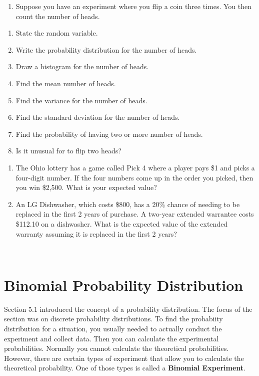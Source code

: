 \documentclass[]{book}
\providecommand{\tightlist}{%
  \setlength{\itemsep}{0pt}\setlength{\parskip}{0pt}}
\begin{document}
\begin{enumerate}
\def\labelenumi{\arabic{enumi}.}
\setcounter{enumi}{1}
\tightlist
\item
  Suppose you have an experiment where you flip a coin three times. You then count the number of heads.
\end{enumerate}

\begin{enumerate}
\def\labelenumi{\alph{enumi}.}
\tightlist
\item
  State the random variable.
\item
  Write the probability distribution for the number of heads.
\item
  Draw a histogram for the number of heads.
\item
  Find the mean number of heads.
\item
  Find the variance for the number of heads.
\item
  Find the standard deviation for the number of heads.
\item
  Find the probability of having two or more number of heads.
\item
  Is it unusual for to flip two heads?
\end{enumerate}

\begin{enumerate}
\def\labelenumi{\arabic{enumi}.}
\setcounter{enumi}{2}
\item
  The Ohio lottery has a game called Pick 4 where a player pays \$1 and picks a four-digit number. If the four numbers come up in the order you picked, then you win \$2,500. What is your expected value?
\item
  An LG Dishwasher, which costs \$800, has a 20\% chance of needing to be replaced in the first 2 years of purchase. A two-year extended warrantee costs \$112.10 on a dishwasher. What is the expected value of the extended warranty assuming it is replaced in the first 2 years?
\end{enumerate}

\textbf{\\
}

\hypertarget{binomial-probability-distribution}{%
\section{Binomial Probability Distribution}\label{binomial-probability-distribution}}

Section 5.1 introduced the concept of a probability distribution. The focus of the section was on discrete probability distributions. To find the probabiity distribution for a situation, you usually needed to actually conduct the experiment and collect data. Then you can calculate the experimental probabilities. Normally you cannot calculate the theoretical probabilities. However, there are certain types of experiment that allow you to calculate the theoretical probability. One of those types is called a \textbf{Binomial Experiment}.
\end{document}
